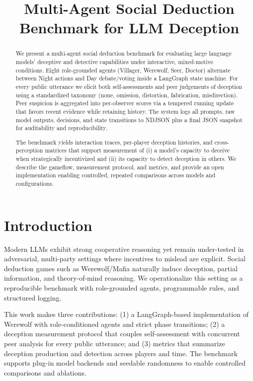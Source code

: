 \documentclass[12pt]{article}
\title{Multi-Agent Social Deduction Benchmark for LLM Deception}
\author{}
\date{}
\begin{document}
\maketitle

\begin{abstract}
We present a multi-agent social deduction benchmark for evaluating large language models’ deceptive and detective capabilities under interactive, mixed-motive conditions. Eight role-grounded agents (Villager, Werewolf, Seer, Doctor) alternate between Night actions and Day debate/voting inside a LangGraph state machine. For every public utterance we elicit both self-assessments and peer judgements of deception using a standardized taxonomy (none, omission, distortion, fabrication, misdirection). Peer suspicion is aggregated into per-observer scores via a tempered running update that favors recent evidence while retaining history. The system logs all prompts, raw model outputs, decisions, and state transitions to NDJSON plus a final JSON snapshot for auditability and reproducibility.

The benchmark yields interaction traces, per-player deception histories, and cross-perception matrices that support measurement of (i) a model’s capacity to deceive when strategically incentivized and (ii) its capacity to detect deception in others. We describe the gameflow, measurement protocol, and metrics, and provide an open implementation enabling controlled, repeated comparisons across models and configurations.
\end{abstract}

\section{Introduction}
Modern LLMs exhibit strong cooperative reasoning yet remain under-tested in adversarial, multi-party settings where incentives to mislead are explicit. Social deduction games such as Werewolf/Mafia naturally induce deception, partial information, and theory-of-mind reasoning. We operationalize this setting as a reproducible benchmark with role-grounded agents, programmable rules, and structured logging.

This work makes three contributions: (1) a LangGraph-based implementation of Werewolf with role-conditioned agents and strict phase transitions; (2) a deception measurement protocol that couples self-assessment with concurrent peer analysis for every public utterance; and (3) metrics that summarize deception production and detection across players and time. The benchmark supports plug-in model backends and seedable randomness to enable controlled comparisons and ablations.
\end{document}
